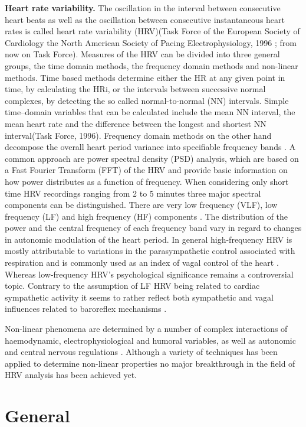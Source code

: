 \textbf{Heart rate variability.} The oscillation in the interval between consecutive heart beats as well as the oscillation between consecutive instantaneous heart rates is called heart rate variability (HRV)(Task Force of the European Society of Cardiology the North American Society of Pacing Electrophysiology, 1996 ; from now on Task Force).
Measures of the HRV can be divided into three general groups, the time domain methods, the frequency domain methods and non-linear methods. Time based methods determine either the HR at any given point in time, by calculating the HRi, or the intervals between successive normal complexes, by detecting the so called normal-to-normal (NN) intervals.
Simple time–domain variables that can be calculated include the mean NN interval, the mean heart rate and the
difference between the longest and shortest NN interval(Task Force, 1996). Frequency domain methods on the other hand decompose the overall heart period variance into specifiable frequency bands \citep{HANDBOOKPP}. A common approach are power spectral density (PSD) analysis, which are based on a Fast Fourier Transform (FFT) of the HRV and provide basic information on how power distributes as a function of frequency. When considering only short time HRV recordings ranging from 2 to 5 minutes three major spectral components can be distinguished. There are very low frequency (VLF), low frequency (LF) and high frequency (HF) components \cite{TASK1996}. The distribution of the power and the central frequency of each frequency band vary in regard to changes in autonomic modulation of the heart period. In general high-frequency HRV is mostly attributable to variations in the parasympathetic control associated with respiration and is commonly used as an index of vagal control of the heart \citep{HANDBOOKPP}. Whereas low-frequency HRV's psychological significance remains a controversial topic. Contrary to the assumption of LF HRV being related to cardiac sympathetic activity it seems to rather  reflect both sympathetic and vagal influences related to baroreflex mechanisms \cite{BERNTSON1997}.

Non-linear phenomena are determined by a number of complex interactions of haemodynamic, electrophysiological and humoral variables, as well as autonomic and central nervous regulations \cite{TASK1996}. Although a  variety of techniques has been applied to determine non-linear properties no major breakthrough in the field of HRV analysis has been achieved yet. 


\section{General}
